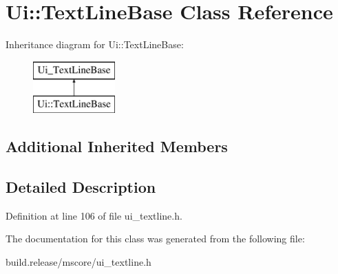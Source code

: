 \hypertarget{class_ui_1_1_text_line_base}{}\section{Ui\+:\+:Text\+Line\+Base Class Reference}
\label{class_ui_1_1_text_line_base}
Inheritance diagram for Ui\+:\+:Text\+Line\+Base\+:\begin{figure}[H]
\begin{center}
\leavevmode
\includegraphics[height=2.000000cm]{class_ui_1_1_text_line_base}
\end{center}
\end{figure}
\subsection*{Additional Inherited Members}


\subsection{Detailed Description}


Definition at line 106 of file ui\+\_\+textline.\+h.



The documentation for this class was generated from the following file\+:\begin{DoxyCompactItemize}
\item 
build.\+release/mscore/ui\+\_\+textline.\+h\end{DoxyCompactItemize}
